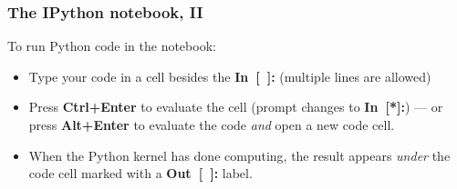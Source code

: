 \documentclass[english,xcolor=pdftex,dvipsnames,table]{beamer}
\begin{document}
\begin{frame}
  \frametitle{The IPython notebook, II}

  To run Python code in the notebook:
  \begin{itemize}
  \item Type your code in a cell besides the {\ttfamily\bfseries\color{blue}
      In~[~]:} (multiple lines are allowed)
  \item Press \textbf{Ctrl+Enter} to evaluate the cell (prompt changes to
    {\ttfamily\bfseries\color{blue} In~[*]:}) --- or press \textbf{Alt+Enter} to
    evaluate the code \emph{and} open a new code cell.
  \item When the Python kernel has done computing, the result appears \emph{under} the
    code cell marked with a {\ttfamily\bfseries\color{red} Out~[~]:} label.
  \end{itemize}
\end{frame}



\end{document}
